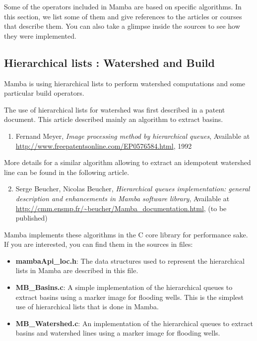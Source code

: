 \documentclass[a4paper,10pt,oneside]{article}
\begin{document}
Some of the operators included in Mamba are based on specific algorithms.
In this section, we list some of them and give references to the articles or 
courses that describe them. You can also take a glimpse inside the sources to
see how they were implemented.

\subsection{Hierarchical lists : Watershed and Build}

Mamba is using hierarchical lists to perform watershed computations and some
particular build operators.

The use of hierarchical lists for watershed was first described in a patent 
document. This article described mainly an algorithm to extract basins.

\begin{enumerate}
\setcounter{enumi}{0}
\item \label{art:meyer} Fernand Meyer,
\emph{Image processing method by hierarchical queues},
Available at \url{http://www.freepatentsonline.com/EP0576584.html}, 1992
\end{enumerate}

More details for a similar algorithm allowing to extract an idempotent 
watershed line can be found in the following article.

\begin{enumerate}
\setcounter{enumi}{1}
\item \label{art:beucher2} Serge Beucher, Nicolas Beucher,
\emph{Hierarchical queues implementation: general description and enhancements
in Mamba software library},
Available at \url{http://cmm.ensmp.fr/\~beucher/Mamba\_documentation.html},
(to be published)
\end{enumerate}

Mamba implements these algorithms in the C core library for performance sake.
If you are interested, you can find them in the sources in files:

\begin{itemize}
\item \textbf{mambaApi\_loc.h}: The data structures used to represent the 
hierarchical lists in Mamba are described in this file.
\item \textbf{MB\_Basins.c}: A simple implementation of the hierarchical queues
to extract basins using a marker image for flooding wells. This is the simplest
use of hierarchical lists that is done in Mamba.
\item \textbf{MB\_Watershed.c}: An implementation of the hierarchical queues to
extract basins and watershed lines using a marker image for flooding wells.
\end{itemize}
\end{document}

